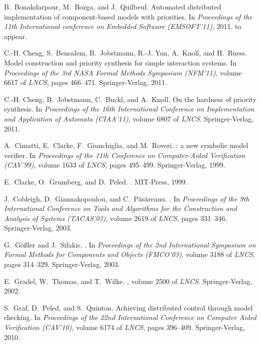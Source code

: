 \documentclass[10pt, a4paper, onecolumn, conference, compsocconf]{IEEEtran}
\begin{document}
\begin{thebibliography}{10}
B.~Bonakdarpour, M.~Bozga, and J.~Quilbeuf.
\newblock Automated distributed implementation of component-based models with
  priorities.
\newblock In {\em Proceedings of the 11th International conference on Embedded
  Software (EMSOFT'11)}, 2011.
\newblock to appear.

C.-H. Cheng, S.~Bensalem, B.~Jobstmann, R.-J. Yan, A.~Knoll, and H.~Ruess.
\newblock Model construction and priority synthesis for simple interaction
  systems.
\newblock In {\em Proceedings of the 3rd NASA Formal Methods Symposium
  (NFM'11)}, volume 6617 of {\em LNCS}, pages 466--471. Springer-Verlag, 2011.

C.-H. Cheng, B.~Jobstmann, C.~Buckl, and A.~Knoll.
\newblock On the hardness of priority synthesis.
\newblock In {\em Proceedings of the 16th International Conference on
  Implementation and Application of Automata (CIAA'11)}, volume 6807 of {\em
  LNCS}. Springer-Verlag, 2011.

A.~Cimatti, E.~Clarke, F.~Giunchiglia, and M.~Roveri.
: a new symbolic model verifier.
\newblock In {\em Proceedings of the 11th Conference on Computer-Aided
  Verification (CAV'99)}, volume 1633 of {\em LNCS}, pages 495--499.
  Springer-Verlag, 1999.

E.~Clarke, O.~Grumberg, and D.~Peled.
.
\newblock MIT-Press, 1999.

J.~Cobleigh, D.~Giannakopoulou, and C.~P{\u{a}}s{\u{a}}reanu.
.
\newblock In {\em Proceedings of the 9th International Conference on Tools and
  Algorithms for the Construction and Analysis of Systems (TACAS'03)}, volume
  2619 of {\em LNCS}, pages 331--346. Springer-Verlag, 2003.

G.~G{\"o}{\ss}ler and J.~Sifakis.
.
\newblock In {\em Proceedings of the 2nd International Symposium on Formal
  Methods for Components and Objects (FMCO'03)}, volume 3188 of {\em LNCS},
  pages 314--329. Springer-Verlag, 2003.

E.~Gradel, W.~Thomas, and T.~Wilke.
, volume 2500 of {\em
  LNCS}.
\newblock Springer-Verlag, 2002.

S.~Graf, D.~Peled, and S.~Quinton.
\newblock Achieving distributed control through model checking.
\newblock In {\em Proceedings of the 22nd International Conference on Computer
  Aided Verification (CAV'10)}, volume 6174 of {\em LNCS}, pages 396--409.
  Springer-Verlag, 2010.


\end{thebibliography}
\end{document}
